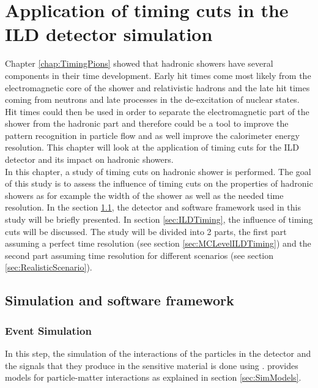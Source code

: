 \chapter{Application of timing cuts in the ILD detector simulation}
\label{chap:ILDTiming}

Chapter \ref{chap:TimingPions} showed that hadronic showers have several components in their time development. Early hit times come most likely from the electromagnetic core of the shower and relativistic hadrons and the late hit times coming from neutrons and late processes in the de-excitation of nuclear states. Hit times could then be used in order to separate the electromagnetic part of the shower from the hadronic part and therefore could be a tool to improve the pattern recognition in particle flow and as well improve the calorimeter energy resolution. This chapter will look at the application of timing cuts for the ILD detector and its impact on hadronic showers.\\

In this chapter, a study of timing cuts on hadronic shower is performed. The goal of this study is to assess the influence of timing cuts on the properties of hadronic showers as for example the width of the shower as well as the needed time resolution. In the section \ref{sec:Framework}, the detector and software framework used in this study will be briefly presented. In section \ref{sec:ILDTiming}, the influence of timing cuts will be discussed. The study will be divided into 2 parts, the first part assuming a perfect time resolution (see section \ref{sec:MCLevelILDTiming}) and the second part assuming time resolution for different scenarios (see section \ref{sec:RealisticScenario}).

\section{Simulation and software framework}
\label{sec:Framework}

\subsection{Event Simulation}

In this step, the simulation of the interactions of the particles in the detector and the signals that they produce in the sensitive material is done using \geant. \geant provides models for particle-matter interactions as explained in section \ref{sec:SimModels}.

